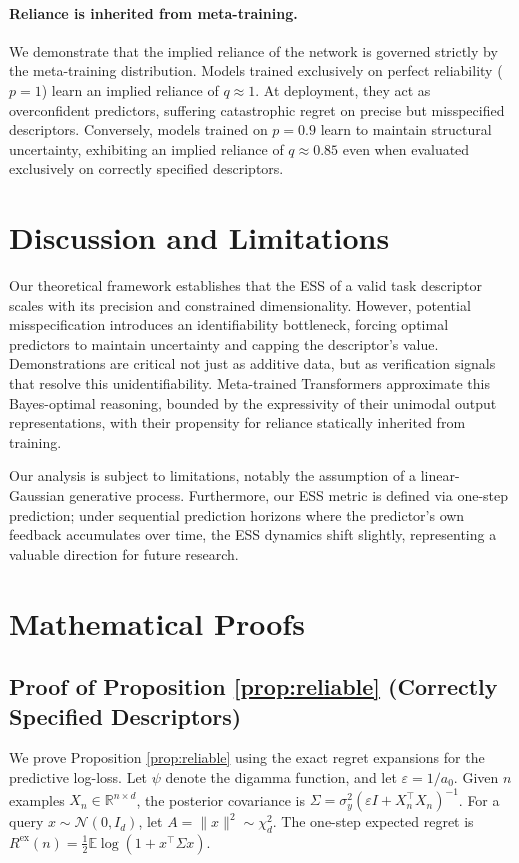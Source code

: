 \documentclass{article}
\begin{document}
\paragraph{Reliance is inherited from meta-training.} We demonstrate that the implied reliance of the network is governed strictly by the meta-training distribution. Models trained exclusively on perfect reliability ($p=1$) learn an implied reliance of $q \approx 1$. At deployment, they act as overconfident predictors, suffering catastrophic regret on precise but misspecified descriptors. Conversely, models trained on $p=0.9$ learn to maintain structural uncertainty, exhibiting an implied reliance of $q \approx 0.85$ even when evaluated exclusively on correctly specified descriptors.

\section{Discussion and Limitations}
Our theoretical framework establishes that the ESS of a valid task descriptor scales with its precision and constrained dimensionality. However, potential misspecification introduces an identifiability bottleneck, forcing optimal predictors to maintain uncertainty and capping the descriptor's value. Demonstrations are critical not just as additive data, but as verification signals that resolve this unidentifiability. Meta-trained Transformers approximate this Bayes-optimal reasoning, bounded by the expressivity of their unimodal output representations, with their propensity for reliance statically inherited from training.

Our analysis is subject to limitations, notably the assumption of a linear-Gaussian generative process. Furthermore, our ESS metric is defined via one-step prediction; under sequential prediction horizons where the predictor's own feedback accumulates over time, the ESS dynamics shift slightly, representing a valuable direction for future research.

\appendix
\section{Mathematical Proofs}

\subsection{Proof of Proposition \ref{prop:reliable} (Correctly Specified Descriptors)}
We prove Proposition \ref{prop:reliable} using the exact regret expansions for the predictive log-loss. 
Let $\psi$ denote the digamma function, and let $\varepsilon = 1/a_0$. Given $n$ examples $X_n \in \mathbb{R}^{n \times d}$, the posterior covariance is $\Sigma = \sigma_y^2 (\varepsilon I + X_n^\top X_n)^{-1}$.
For a query $x \sim \mathcal{N}(0, I_d)$, let $A = \|x\|^2 \sim \chi^2_d$. The one-step expected regret is $R^{\text{ex}}(n) = \frac{1}{2} \mathbb{E} \log(1 + x^\top \Sigma x)$.
\end{document}
